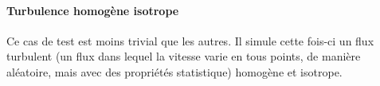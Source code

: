 \paragraph{Turbulence homogène isotrope}Ce cas de test est moins trivial que les autres. Il simule cette fois-ci un flux turbulent (un flux dans lequel la vitesse varie en tous points, de manière aléatoire, mais avec des propriétés statistique) homogène et isotrope.




